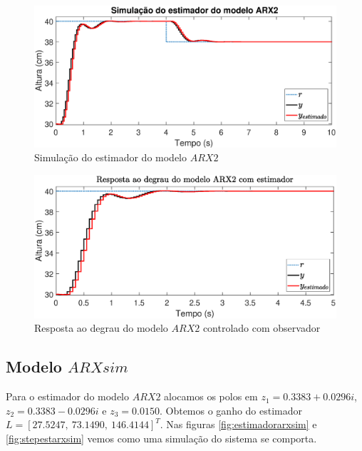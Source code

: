 \begin{figure}[H]
	\centering
	\includegraphics[width=1\linewidth]{estimadorarx2}
	\caption[Simulação do estimador do modelo $ARX2$]{Simulação do estimador do modelo $ARX2$}
	\label{fig:estimadorarx2}
\end{figure}

\begin{figure}[H]
	\centering
	\includegraphics[width=1\linewidth]{stepestarx2}
	\caption[Resposta ao degrau do modelo $ARX2$ controlado com observador]{Resposta ao degrau do modelo $ARX2$ controlado com observador}
	\label{fig:stepestarx2}
\end{figure}

\subsection{Modelo $ARXsim$}
Para o estimador do modelo $ARX2$ alocamos os polos em $z_1=0.3383 + 0.0296i$, $z_2=0.3383 - 0.0296i$ e $z_3=0.0150$. Obtemos o ganho do estimador $L=[27.5247,~ 73.1490,~ 146.4144]^T$. Nas figuras \ref{fig:estimadorarxsim} e \ref{fig:stepestarxsim} vemos como uma simulação do sistema se comporta.

